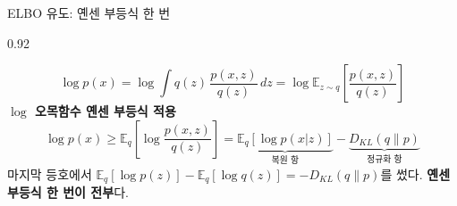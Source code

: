 \begin{frame}{ELBO 유도: 옌센 부등식 한 번}
\begin{center}\begin{varwidth}{0.92\textwidth}
  
  \[
  \log p(x) = \log \int q(z)\,\frac{p(x,z)}{q(z)}\,dz
  = \log \mathbb{E}_{z \sim q}\left[\frac{p(x,z)}{q(z)}\right]
  \]
  \textbf{$\log$ 오목함수 옌센 부등식 적용}
  \[
  \log p(x) \ge \mathbb{E}_q\left[\log \frac{p(x,z)}{q(z)}\right]
  = \underbrace{\mathbb{E}_q[\log p(x|z)]}_{\text{복원 항}}
  - \underbrace{D_{KL}(q \| p)}_{\text{정규화 항}}
  \]
  마지막 등호에서 $\mathbb{E}_q[\log p(z)] - \mathbb{E}_q[\log q(z)]
  = -D_{KL}(q\|p)$를 썼다. \textbf{옌센 부등식 한 번이 전부}다.
\end{varwidth}\end{center}
\end{frame}
